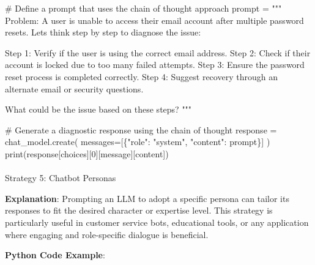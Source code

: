 \documentclass[
]{agujournal2019}
\makeatletter
\let\oldparagraph\paragraph
\renewcommand{\paragraph}{
    \@ifstar
      \xxxParagraphStar
      \xxxParagraphNoStar
  }
\newcommand{\xxxParagraphStar}[1]{\oldparagraph*{#1}\mbox{}}
\newcommand{\xxxParagraphNoStar}[1]{\oldparagraph{#1}\mbox{}}
\newenvironment{Shaded}{\begin{snugshade}}{\end{snugshade}}
\newcommand{\BuiltInTok}[1]{\textcolor[rgb]{0.00,0.23,0.31}{#1}}
\newcommand{\CommentTok}[1]{\textcolor[rgb]{0.37,0.37,0.37}{#1}}
\newcommand{\DecValTok}[1]{\textcolor[rgb]{0.68,0.00,0.00}{#1}}
\newcommand{\NormalTok}[1]{\textcolor[rgb]{0.00,0.23,0.31}{#1}}
\newcommand{\OperatorTok}[1]{\textcolor[rgb]{0.37,0.37,0.37}{#1}}
\newcommand{\StringTok}[1]{\textcolor[rgb]{0.13,0.47,0.30}{#1}}
\makeatother
\begin{document}
\begin{Shaded}
\begin{Highlighting}[]
\CommentTok{\# Define a prompt that uses the chain of thought approach}
\NormalTok{prompt }\OperatorTok{=} \StringTok{"""}
\StringTok{Problem: A user is unable to access their email account after multiple password resets. Let\textquotesingle{}s think step by step to diagnose the issue:}

\StringTok{Step 1: Verify if the user is using the correct email address.}
\StringTok{Step 2: Check if their account is locked due to too many failed attempts.}
\StringTok{Step 3: Ensure the password reset process is completed correctly.}
\StringTok{Step 4: Suggest recovery through an alternate email or security questions.}

\StringTok{What could be the issue based on these steps?}
\StringTok{"""}

\CommentTok{\# Generate a diagnostic response using the chain of thought}
\NormalTok{response }\OperatorTok{=}\NormalTok{ chat\_model.create(}
\NormalTok{    messages}\OperatorTok{=}\NormalTok{[\{}\StringTok{"role"}\NormalTok{: }\StringTok{"system"}\NormalTok{, }\StringTok{"content"}\NormalTok{: prompt\}]}
\NormalTok{)}
\BuiltInTok{print}\NormalTok{(response[}\StringTok{\textquotesingle{}choices\textquotesingle{}}\NormalTok{][}\DecValTok{0}\NormalTok{][}\StringTok{\textquotesingle{}message\textquotesingle{}}\NormalTok{][}\StringTok{\textquotesingle{}content\textquotesingle{}}\NormalTok{])}
\end{Highlighting}
\end{Shaded}

\paragraph{Strategy 5: Chatbot
Personas}\label{strategy-5-chatbot-personas}

\textbf{Explanation}: Prompting an LLM to adopt a specific persona can
tailor its responses to fit the desired character or expertise level.
This strategy is particularly useful in customer service bots,
educational tools, or any application where engaging and role-specific
dialogue is beneficial.

\textbf{Python Code Example}:
\end{document}
